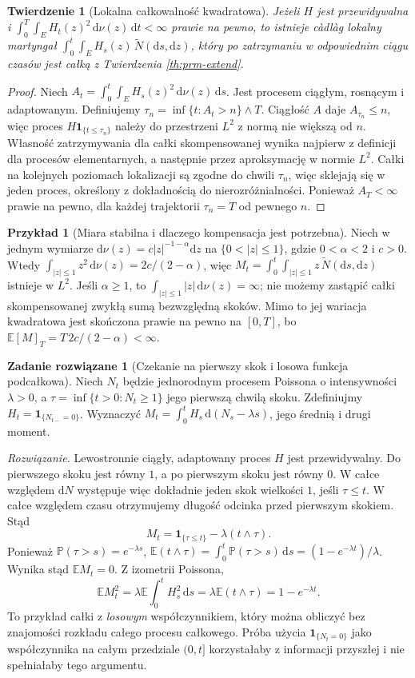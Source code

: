 \documentclass[11pt,a4paper,oneside]{report}
\numberwithin{equation}{chapter}
\theoremstyle{plain}
\newtheorem{twierdzenie}{Twierdzenie}[chapter]
\theoremstyle{definition}
\newtheorem{przyklad}{Przykład}[chapter]
\newtheorem{zadanie}{Zadanie rozwiązane}[chapter]
\theoremstyle{remark}
\newcommand{\Prob}{\mathbb{P}}
\newcommand{\E}{\mathbb{E}}
\newcommand{\ind}[1]{\mathbf{1}_{#1}}
\newcommand{\dd}{\mathrm{d}}
\begin{document}
\begin{twierdzenie}[Lokalna całkowalność kwadratowa]
\label{th:prm-local}
Jeżeli $H$ jest przewidywalna i
$\int_0^T\int_EH_t(z)^2\,\dd\nu(z)\,\dd t<\infty$
prawie na pewno, to istnieje càdlàg lokalny martyngał
$\int_0^t\int_EH_s(z)\,\widetilde N(\dd s,\dd z)$,
który po zatrzymaniu w odpowiednim ciągu czasów
jest całką z Twierdzenia \ref{th:prm-extend}.
\end{twierdzenie}
\begin{proof}
Niech $A_t=\int_0^t\int_EH_s(z)^2\,\dd\nu(z)\,\dd s$.
Jest procesem ciągłym, rosnącym i adaptowanym.
Definiujemy $\tau_n=\inf\{t:A_t>n\}\wedge T$.
Ciągłość $A$ daje $A_{\tau_n}\le n$, więc proces
$H\ind{\{t\le\tau_n\}}$ należy do przestrzeni $L^2$
z normą nie większą od $n$. Własność zatrzymywania dla
całki skompensowanej wynika najpierw z definicji dla
procesów elementarnych, a następnie przez aproksymację
w normie $L^2$. Całki na kolejnych poziomach lokalizacji
są zgodne do chwili $\tau_n$, więc sklejają się w jeden
proces, określony z dokładnością do nierozróżnialności.
Ponieważ $A_T<\infty$ prawie na pewno, dla każdej
trajektorii $\tau_n=T$ od pewnego $n$.
\end{proof}

\begin{przyklad}[Miara stabilna i dlaczego kompensacja jest potrzebna]
Niech w jednym wymiarze $\dd\nu(z)=c|z|^{-1-\alpha}\dd z$
na $\{0<|z|\le1\}$, gdzie $0<\alpha<2$ i $c>0$.
Wtedy $\int_{|z|\le1}z^2\,\dd\nu(z)=2c/(2-\alpha)$,
więc $M_t=\int_0^t\int_{|z|\le1}z\,\widetilde N(\dd s,\dd z)$
istnieje w $L^2$. Jeśli $\alpha\ge1$, to
$\int_{|z|\le1}|z|\,\dd\nu(z)=\infty$; nie możemy
zastąpić całki skompensowanej zwykłą sumą bezwzględną
skoków. Mimo to jej wariacja kwadratowa jest skończona
prawie na pewno na $[0,T]$, bo
$\E[M]_T=T\,2c/(2-\alpha)<\infty$.
\end{przyklad}

\begin{zadanie}[Czekanie na pierwszy skok i losowa funkcja podcałkowa]
Niech $N_t$ będzie jednorodnym procesem Poissona o intensywności
$\lambda>0$, a $\tau=\inf\{t>0:N_t\ge1\}$ jego pierwszą chwilą
skoku. Zdefiniujmy $H_t=\ind{\{N_{t-}=0\}}$.
Wyznaczyć $M_t=\int_0^tH_s\,\dd(N_s-\lambda s)$, jego
średnią i drugi moment.

\emph{Rozwiązanie.} Lewostronnie ciągły, adaptowany proces
$H$ jest przewidywalny. Do pierwszego skoku jest równy $1$,
a po pierwszym skoku jest równy $0$. W całce względem
$\dd N$ występuje więc dokładnie jeden skok wielkości $1$,
jeśli $\tau\le t$. W całce względem czasu otrzymujemy
długość odcinka przed pierwszym skokiem. Stąd
\[
M_t=\ind{\{\tau\le t\}}-\lambda(t\wedge\tau).
\]
Ponieważ $\Prob(\tau>s)=e^{-\lambda s}$,
$\E(t\wedge\tau)=\int_0^t\Prob(\tau>s)\,\dd s
=(1-e^{-\lambda t})/\lambda$.
Wynika stąd $\E M_t=0$. Z izometrii Poissona,
\[
\E M_t^2=\lambda\E\int_0^tH_s^2\,\dd s
=\lambda\E(t\wedge\tau)=1-e^{-\lambda t}.
\]
To przykład całki z \emph{losowym} współczynnikiem,
który można obliczyć bez znajomości rozkładu całego procesu
całkowego. Próba użycia $\ind{\{N_t=0\}}$ jako współczynnika
na całym przedziale $(0,t]$ korzystałaby z informacji
przyszłej i nie spełniałaby tego argumentu.
\end{zadanie}
\end{document}
